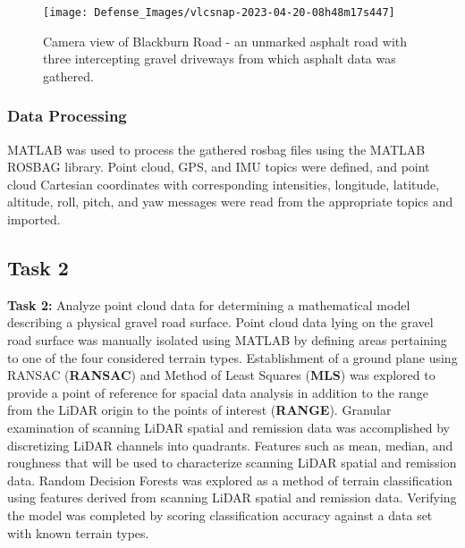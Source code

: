 \documentclass[numbered,pdftex]{ohio-etd}
\begin{document}
{{{{				\begin{figure}[H]
					\centering
					\texttt{[image: Defense\_Images/vlcsnap-2023-04-20-08h48m17s447]}
					\caption[Blackburn Road Camera View]{Camera view of Blackburn Road - an unmarked asphalt road with three intercepting gravel driveways from which asphalt data was gathered.}
					\label{fig:Blackburn_Road_View}
				\end{figure}
				
				
				
										
			} %
				
			\subsubsection{Data Processing}\label{sec:data_processing}{

				{MATLAB was used to process the gathered rosbag files using the MATLAB ROSBAG library. Point cloud, GPS, and IMU topics were defined, and point cloud Cartesian coordinates with corresponding intensities, longitude, latitude, altitude, roll, pitch, and yaw messages were read from the appropriate topics and imported.}
		
			} %
				
		} %

		\subsection{Task 2}{

			\textbf{Task 2: }{Analyze point cloud data for determining a mathematical model describing a physical gravel road surface. Point cloud data lying on the gravel road surface was manually isolated using MATLAB by defining areas pertaining to one of the four considered terrain types. Establishment of a ground plane using RANSAC (\textbf{RANSAC}) and Method of Least Squares (\textbf{MLS}) was explored to provide a point of reference for spacial data analysis in addition to the range from the LiDAR origin to the points of interest (\textbf{RANGE}). Granular examination of scanning LiDAR spatial and remission data was accomplished by discretizing LiDAR channels into quadrants. Features such as mean, median, and roughness that will be used to characterize scanning LiDAR spatial and remission data. Random Decision Forests was explored as a method of terrain classification using features derived from scanning LiDAR spatial and remission data. Verifying the model was completed by scoring classification accuracy against a  data set with known terrain types.}
			
}}}
\end{document}
